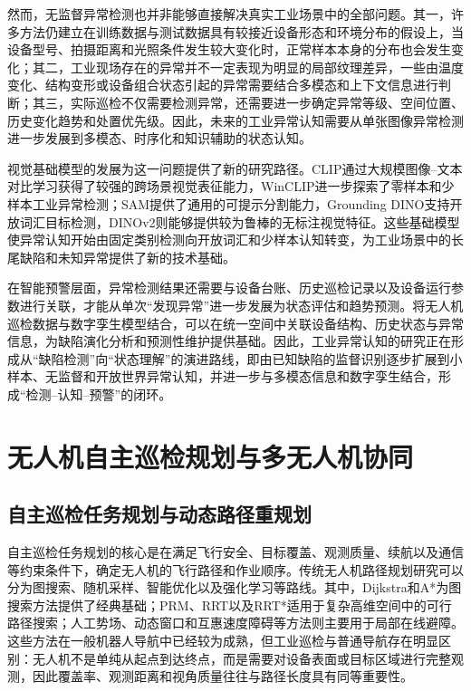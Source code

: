 然而，无监督异常检测也并非能够直接解决真实工业场景中的全部问题。其一，许多方法仍建立在训练数据与测试数据具有较接近设备形态和环境分布的假设上，当设备型号、拍摄距离和光照条件发生较大变化时，正常样本本身的分布也会发生变化；其二，工业现场存在的异常并不一定表现为明显的局部纹理差异，一些由温度变化、结构变形或设备组合状态引起的异常需要结合多模态和上下文信息进行判断；其三，实际巡检不仅需要检测异常，还需要进一步确定异常等级、空间位置、历史变化趋势和处置优先级。因此，未来的工业异常认知需要从单张图像异常检测进一步发展到多模态、时序化和知识辅助的状态认知。

视觉基础模型的发展为这一问题提供了新的研究路径。CLIP通过大规模图像--文本对比学习获得了较强的跨场景视觉表征能力\cite{radford2021learning}，WinCLIP进一步探索了零样本和少样本工业异常检测\cite{jeong2023winclip}；SAM提供了通用的可提示分割能力\cite{kirillov2023segment}，Grounding DINO支持开放词汇目标检测，DINOv2则能够提供较为鲁棒的无标注视觉特征\cite{liu2024grounding,oquab2024dinov2}。这些基础模型使异常认知开始由固定类别检测向开放词汇和少样本认知转变，为工业场景中的长尾缺陷和未知异常提供了新的技术基础。

在智能预警层面，异常检测结果还需要与设备台账、历史巡检记录以及设备运行参数进行关联，才能从单次“发现异常”进一步发展为状态评估和趋势预测。将无人机巡检数据与数字孪生模型结合，可以在统一空间中关联设备结构、历史状态与异常信息，为缺陷演化分析和预测性维护提供基础\cite{tao2019digital}。因此，工业异常认知的研究正在形成从“缺陷检测”向“状态理解”的演进路线，即由已知缺陷的监督识别逐步扩展到小样本、无监督和开放世界异常认知，并进一步与多模态信息和数字孪生结合，形成“检测--认知--预警”的闭环。

\section{无人机自主巡检规划与多无人机协同}

\subsection{自主巡检任务规划与动态路径重规划}

自主巡检任务规划的核心是在满足飞行安全、目标覆盖、观测质量、续航以及通信等约束条件下，确定无人机的飞行路径和作业顺序。传统无人机路径规划研究可以分为图搜索、随机采样、智能优化以及强化学习等路线\cite{wangq2019overview,liuqj2023survey}。其中，Dijkstra和A*为图搜索方法提供了经典基础\cite{dijkstra1959note,hart1968formal}；PRM、RRT以及RRT*适用于复杂高维空间中的可行路径搜索\cite{kavraki1996probabilistic,lavalle2001randomized,karaman2011sampling}；人工势场、动态窗口和互惠速度障碍等方法则主要用于局部在线避障\cite{khatib1986real,fox1997dynamic,van2011reciprocal}。这些方法在一般机器人导航中已经较为成熟，但工业巡检与普通导航存在明显区别：无人机不是单纯从起点到达终点，而是需要对设备表面或目标区域进行完整观测，因此覆盖率、观测距离和视角质量往往与路径长度具有同等重要性。

